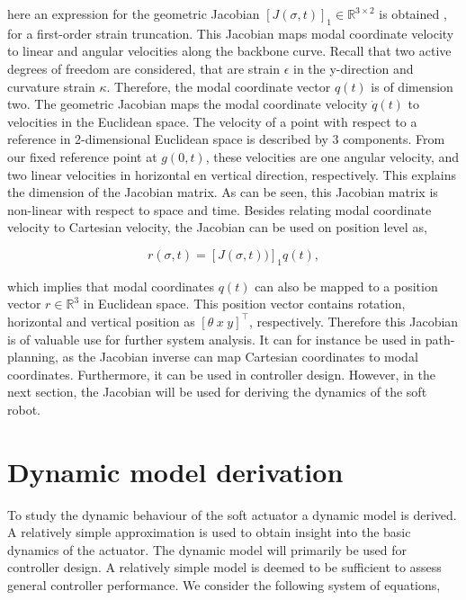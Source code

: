 here an expression for the geometric Jacobian $[J(\sigma,t)]_1 \in \mathbb{R}^{3\times 2}$ is obtained \cite{Caasenbrood2020}, for a first-order strain truncation. This Jacobian maps modal coordinate velocity to linear and angular velocities along the backbone curve. Recall that two active degrees of freedom are considered, that are strain $\epsilon$ in the y-direction and curvature strain $\kappa$. Therefore, the modal coordinate vector $q(t)$ is of dimension two. The geometric Jacobian maps the modal coordinate velocity $\dot{q}(t)$ to velocities in the Euclidean space. The velocity of a point with respect to a reference in 2-dimensional Euclidean space is described by 3 components. From our fixed reference point at $g(0,t)$, these velocities are one angular velocity, and two linear velocities in horizontal en vertical direction, respectively. This explains the dimension of the Jacobian matrix. As can be seen, this Jacobian matrix is non-linear with respect to space and time. Besides relating modal coordinate velocity to Cartesian velocity, the Jacobian can be used on position level as,

\begin{equation}
    r(\sigma,t) = [J(\sigma,t))]_1q(t),
\end{equation}

which implies that modal coordinates $q(t)$ can also be mapped to a position vector $r\in \mathbb{R}^3$ in Euclidean space. This position vector contains rotation, horizontal and vertical position as $[\theta \hspace{3pt} x \hspace{3pt} y]^\top$, respectively. Therefore this Jacobian is of valuable use for further system analysis. It can for instance be used in path-planning, as the Jacobian inverse can map Cartesian coordinates to modal coordinates. Furthermore, it can be used in controller design. However, in the next section, the Jacobian will be used for deriving the dynamics of the soft robot. 


\section{Dynamic model derivation}






To study the dynamic behaviour of the soft actuator a dynamic model is derived. A relatively simple approximation is used to obtain insight into the basic dynamics of the actuator. The dynamic model will primarily be used for controller design. A relatively simple model is deemed to be sufficient to assess general controller performance. We consider the following system of equations,

